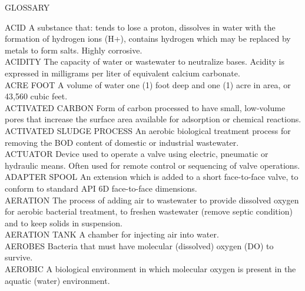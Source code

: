 \newpage
\vfill
\begin{center}
\Huge{GLOSSARY}
\end{center}
\vfill
ACID
A substance that: tends to lose a proton, dissolves in water with the formation of hydrogen ions (H+), contains hydrogen which may be replaced by metals to form salts. Highly corrosive.
\vspace{0.3cm}\\
ACIDITY
The capacity of water or wastewater to neutralize bases. Acidity is expressed in milligrams per liter of equivalent calcium carbonate.
\vspace{0.3cm}\\
ACRE FOOT
A volume of water one (1) foot deep and one (1) acre in area, or 43,560 cubic feet.
\vspace{0.3cm}\\
ACTIVATED CARBON
Form of carbon processed to have small, low-volume pores that increase the surface area available for adsorption or chemical reactions.
\vspace{0.3cm}\\
ACTIVATED SLUDGE PROCESS
An aerobic biological treatment process for removing the BOD content of domestic or industrial wastewater.
\vspace{0.3cm}\\
ACTUATOR
Device used to operate a valve using electric, pneumatic or hydraulic means. Often used for remote control or sequencing of valve operations.
\vspace{0.3cm}\\
ADAPTER SPOOL
An extension which is added to a short face-to-face valve, to conform to standard API 6D face-to-face dimensions.
\vspace{0.3cm}\\
AERATION
The process of adding air to wastewater to provide dissolved oxygen for aerobic bacterial treatment, to freshen wastewater (remove septic condition) and to keep solids in suspension.
\vspace{0.3cm}\\
AERATION TANK
A chamber for injecting air into water.
\vspace{0.3cm}\\
AEROBES
Bacteria that must have molecular (dissolved) oxygen (DO) to survive.
\vspace{0.3cm}\\
AEROBIC
A biological environment in which molecular oxygen is present in the aquatic (water) environment. 
\vspace{0.3cm}\\
